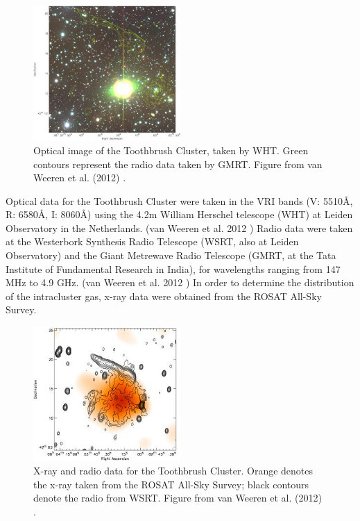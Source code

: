 \documentclass[12 pt]{article}
\renewcommand{\baselinestretch}{2}
\begin{document}
\renewcommand{\baselinestretch}{1}
\begin{figure}[h]
\caption{Optical image of the Toothbrush Cluster, taken by WHT. Green contours represent the radio data taken by GMRT. Figure from van Weeren et al. (2012) \cite{reinout12}.}
\label{optical}
\centering
\includegraphics[width=0.5\textwidth]{toothbrush}
\end{figure}
\renewcommand{\baselinestretch}{2}

Optical data for the Toothbrush Cluster were taken in the VRI bands (V: 5510\AA, R: 6580\AA, I: 8060\AA) using the 4.2m William Herschel telescope (WHT) at Leiden Observatory in the Netherlands. (van Weeren et al. 2012 \cite{reinout12}) Radio data were taken at the Westerbork Synthesis Radio Telescope (WSRT, also at Leiden Observatory) and the Giant Metrewave Radio Telescope (GMRT, at the Tata Institute of Fundamental Research in India), for wavelengths ranging from 147 MHz to 4.9 GHz. (van Weeren et al. 2012 \cite{reinout12}) In order to determine the distribution of the intracluster gas, x-ray data were obtained from the ROSAT All-Sky Survey. 

\renewcommand{\baselinestretch}{1}
\begin{figure}[h]
\caption{X-ray and radio data for the Toothbrush Cluster. Orange denotes the x-ray taken from the ROSAT All-Sky Survey; black contours denote the radio from WSRT. Figure from van Weeren et al. (2012) \cite{reinout12}.}
\label{toothbrush_radio}
\centering
\includegraphics[width=0.5\textwidth]{toothbrush_radio}
\end{figure}
\renewcommand{\baselinestretch}{2}
\end{document}
